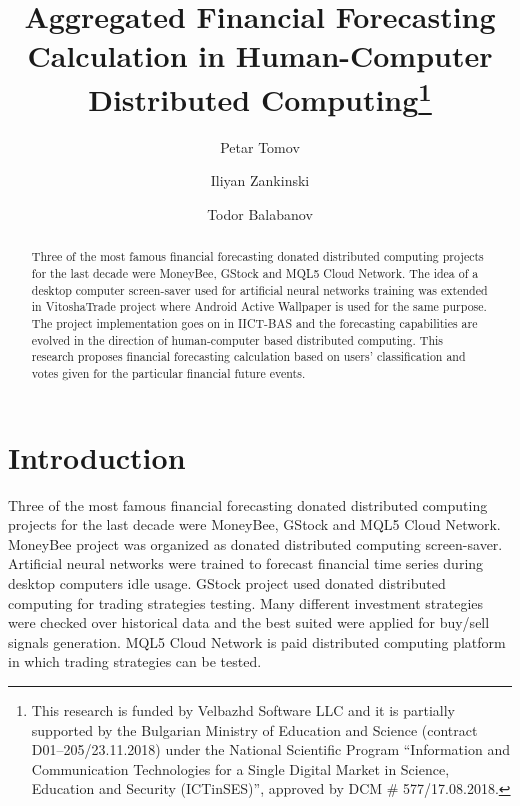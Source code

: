 \documentclass[runningheads]{llncs}
\begin{document}
%
\title{Aggregated Financial Forecasting Calculation in Human-Computer Distributed Computing\thanks{This research is funded by Velbazhd Software LLC and it is partially supported by the Bulgarian Ministry of Education and Science (contract D01–205/23.11.2018) under the National Scientific Program ``Information and Communication Technologies for a Single Digital Market in Science, Education and Security (ICTinSES)'', approved by DCM \# 577/17.08.2018.}}
%
%
\author{Petar Tomov \and Iliyan Zankinski \and Todor Balabanov}
%
%
%
\maketitle              %
%
\begin{abstract}
Three of the most famous financial forecasting donated distributed computing projects for the last decade were MoneyBee, GStock and MQL5 Cloud Network. The idea of a desktop computer screen-saver used for artificial neural networks training was extended in VitoshaTrade project where Android Active Wallpaper is used for the same purpose. The project implementation goes on in IICT-BAS and the forecasting capabilities are evolved in the direction of human-computer based distributed computing. This research proposes financial forecasting calculation based on users' classification and votes given for the particular financial future events. 

\end{abstract}
%
%
%
\section{Introduction}
%
Three of the most famous financial forecasting donated distributed computing projects for the last decade were MoneyBee\cite{money-bee-01}, GStock\cite{g-stock-01} and MQL5 Cloud Network\cite{mql5-cloud-network-01}. MoneyBee project was organized as donated distributed computing screen-saver. Artificial neural networks were trained to forecast financial time series during desktop computers idle usage. GStock project used donated distributed computing for trading strategies testing. Many different investment strategies were checked over historical data and the best suited were applied for buy/sell signals generation. MQL5 Cloud Network is paid distributed computing platform in which trading strategies can be tested. 
\end{document}
